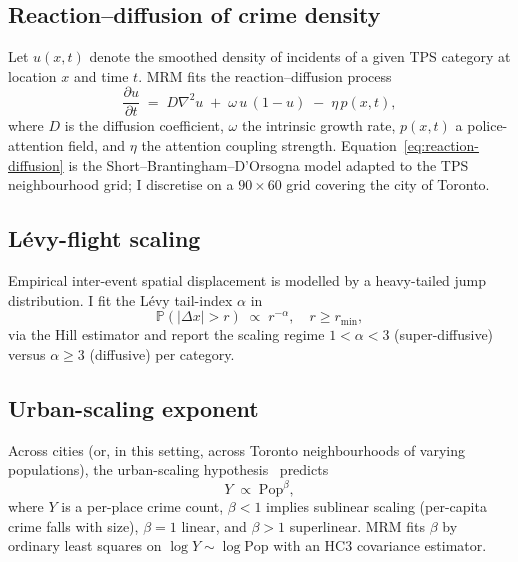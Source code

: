 \documentclass[11pt,a4paper]{article}
\theoremstyle{plain}
\theoremstyle{definition}
\theoremstyle{remark}
\newcommand{\PP}{\mathbb{P}}
\begin{document}
\subsection{Reaction--diffusion of crime density}

Let $u(x, t)$ denote the smoothed density of incidents of a given
TPS category at location $x$ and time $t$. MRM fits the
reaction--diffusion process
\begin{equation}
  \frac{\partial u}{\partial t}
  \;=\; D \nabla^{2} u
   \;+\; \omega\, u\,(1 - u)
   \;-\; \eta\, p(x, t),
  \label{eq:reaction-diffusion}
\end{equation}
where $D$ is the diffusion coefficient, $\omega$ the intrinsic
growth rate, $p(x, t)$ a police-attention field, and $\eta$ the
attention coupling strength.
Equation~\eqref{eq:reaction-diffusion} is the
Short--Brantingham--D'Orsogna model adapted to the TPS
neighbourhood grid; I discretise on a $90 \times 60$ grid
covering the city of Toronto.

\subsection{L\'evy-flight scaling}

Empirical inter-event spatial displacement is modelled by a
heavy-tailed jump distribution. I fit the L\'evy tail-index
$\alpha$ in
\begin{equation}
  \PP(\lvert \Delta x \rvert > r) \;\propto\; r^{-\alpha},
  \quad r \ge r_{\min},
  \label{eq:levy-tail}
\end{equation}
via the Hill estimator and report the scaling regime
$1 < \alpha < 3$ (super-diffusive) versus $\alpha \ge 3$
(diffusive) per category.

\subsection{Urban-scaling exponent}

Across cities (or, in this setting, across Toronto neighbourhoods
of varying populations), the urban-scaling
hypothesis~\cite{Bettencourt2007} predicts
\begin{equation}
  Y \;\propto\; \mathrm{Pop}^{\beta},
  \label{eq:urban-scaling}
\end{equation}
where $Y$ is a per-place crime count, $\beta < 1$ implies
sublinear scaling (per-capita crime falls with size), $\beta = 1$
linear, and $\beta > 1$ superlinear. MRM fits $\beta$ by
ordinary least squares on $\log Y \sim \log \mathrm{Pop}$ with
an HC3 covariance estimator.
\end{document}

